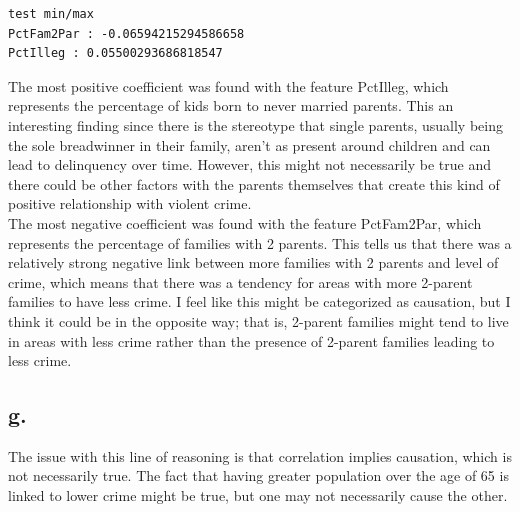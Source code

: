 \documentclass{article}
\newcommand{\1}{\mathbf{1}}
\begin{document}
{\begin{verbatim}
test min/max
PctFam2Par : -0.06594215294586658
PctIlleg : 0.05500293686818547

\end{verbatim}

The most positive coefficient was found with the feature PctIlleg, which represents the percentage of kids born to never married parents. This an interesting finding since there is the stereotype that single parents, usually being the sole breadwinner in their family, aren't as present around children and can lead to delinquency over time. However, this might not necessarily be true and there could be other factors with the parents themselves that create this kind of positive relationship with violent crime. \\
The most negative coefficient was found with the feature PctFam2Par, which represents the percentage of families with 2 parents. This tells us that there was a relatively strong negative link between more families with 2 parents and level of crime, which means that there was a tendency for areas with more 2-parent families to have less crime. I feel like this might be categorized as causation, but I think it could be in the opposite way; that is, 2-parent families might tend to live in areas with less crime rather than the presence of 2-parent families leading to less crime. 

\subsection*{g.}

The issue with this line of reasoning is that correlation implies causation, which is not necessarily true. The fact that having greater population over the age of 65 is linked to lower crime might be true, but one may not necessarily cause the other. 

}
\end{document}
